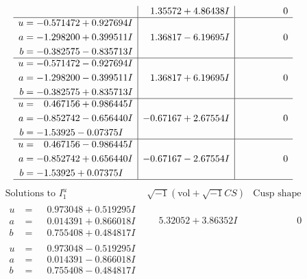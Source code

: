 \documentclass[1p]{elsarticle_modified}
\theoremstyle{definition}
\newcommand{\I}{\sqrt{-1}}
\begin{document}
$$\begin{array}{c|c|c}
 & \phantom{-}1.35572 + 4.86438 I & \phantom{-0.000000 } 0 \\ \hline\begin{aligned}
u &= -0.571472 + 0.927694 I \\
a &= -1.298200 + 0.399511 I \\
b &= -0.382575 - 0.835713 I\end{aligned}
 & \phantom{-}1.36817 - 6.19695 I & \phantom{-0.000000 } 0 \\ \hline\begin{aligned}
u &= -0.571472 - 0.927694 I \\
a &= -1.298200 - 0.399511 I \\
b &= -0.382575 + 0.835713 I\end{aligned}
 & \phantom{-}1.36817 + 6.19695 I & \phantom{-0.000000 } 0 \\ \hline\begin{aligned}
u &= \phantom{-}0.467156 + 0.986445 I \\
a &= -0.852742 - 0.656440 I \\
b &= -1.53925 - 0.07375 I\end{aligned}
 & -0.67167 + 2.67554 I & \phantom{-0.000000 } 0 \\ \hline\begin{aligned}
u &= \phantom{-}0.467156 - 0.986445 I \\
a &= -0.852742 + 0.656440 I \\
b &= -1.53925 + 0.07375 I\end{aligned}
 & -0.67167 - 2.67554 I & \phantom{-0.000000 } 0\\
 \hline 
 \end{array}$$\newpage$$\begin{array}{c|c|c}  
\text{Solutions to }I^u_{1}& \I (\text{vol} + \sqrt{-1}CS) & \text{Cusp shape}\\
 \hline 
\begin{aligned}
u &= \phantom{-}0.973048 + 0.519295 I \\
a &= \phantom{-}0.014391 + 0.866018 I \\
b &= \phantom{-}0.755408 + 0.484817 I\end{aligned}
 & \phantom{-}5.32052 + 3.86352 I & \phantom{-0.000000 } 0 \\ \hline\begin{aligned}
u &= \phantom{-}0.973048 - 0.519295 I \\
a &= \phantom{-}0.014391 - 0.866018 I \\
b &= \phantom{-}0.755408 - 0.484817 I\end{aligned}

\end{array}$$
\end{document}
